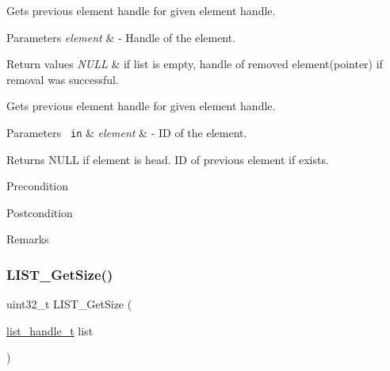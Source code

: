 Gets previous element handle for given element handle. 


\begin{DoxyParams}{Parameters}
{\em element} & -\/ Handle of the element.\\
\hline
\end{DoxyParams}

\begin{DoxyRetVals}{Return values}
{\em N\+U\+LL} & if list is empty, handle of removed element(pointer) if removal was successful.\\
\hline
\end{DoxyRetVals}
Gets previous element handle for given element handle.



 
\begin{DoxyParams}[1]{Parameters}
\mbox{\texttt{ in}}  & {\em element} & -\/ ID of the element.\\
\hline
\end{DoxyParams}
\begin{DoxyReturn}{Returns}
N\+U\+LL if element is head. ID of previous element if exists.
\end{DoxyReturn}
\begin{DoxyPrecond}{Precondition}

\end{DoxyPrecond}
\begin{DoxyPostcond}{Postcondition}

\end{DoxyPostcond}
\begin{DoxyRemark}{Remarks}
\begin{DoxyVerb}\end{DoxyVerb}
 
\end{DoxyRemark}
\mbox{\label{group___generic_list_ga1125ff8a5fe9b3ef81cccad538dae9c7}} 
\subsubsection{\texorpdfstring{LIST\_GetSize()}{LIST\_GetSize()}}
{\footnotesize\ttfamily uint32\+\_\+t L\+I\+S\+T\+\_\+\+Get\+Size (\begin{DoxyParamCaption}\item[{\mbox{\hyperlink{structlist__label}{list\+\_\+handle\+\_\+t}}}]{list }\end{DoxyParamCaption})}



